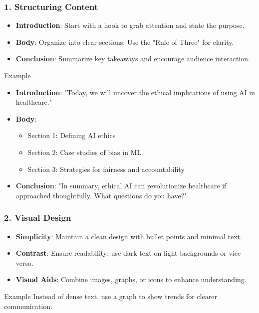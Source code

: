 \documentclass{beamer}
\begin{document}
\begin{frame}[fragile]
    \frametitle{1. Structuring Content}
    \begin{itemize}
        \item \textbf{Introduction}: Start with a hook to grab attention and state the purpose.
        \item \textbf{Body}: Organize into clear sections. Use the "Rule of Three" for clarity.
        \item \textbf{Conclusion}: Summarize key takeaways and encourage audience interaction.
    \end{itemize}
    \begin{block}{Example}
        \begin{itemize}
            \item \textbf{Introduction}: "Today, we will uncover the ethical implications of using AI in healthcare."
            \item \textbf{Body}:
                \begin{itemize}
                    \item Section 1: Defining AI ethics
                    \item Section 2: Case studies of bias in ML
                    \item Section 3: Strategies for fairness and accountability
                \end{itemize}
            \item \textbf{Conclusion}: "In summary, ethical AI can revolutionize healthcare if approached thoughtfully. What questions do you have?"
        \end{itemize}
    \end{block}
\end{frame}

\begin{frame}[fragile]
    \frametitle{2. Visual Design}
    \begin{itemize}
        \item \textbf{Simplicity}: Maintain a clean design with bullet points and minimal text.
        \item \textbf{Contrast}: Ensure readability; use dark text on light backgrounds or vice versa.
        \item \textbf{Visual Aids}: Combine images, graphs, or icons to enhance understanding.
    \end{itemize}
    \begin{block}{Example}
        Instead of dense text, use a graph to show trends for clearer communication.
    \end{block}
\end{frame}
\end{document}
